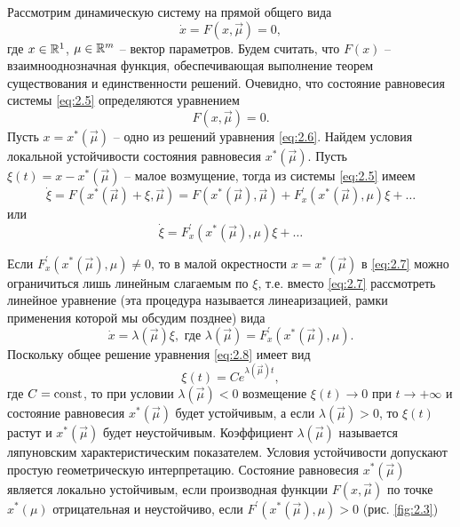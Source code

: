 Рассмотрим динамическую систему на прямой общего вида
\begin{equation}
	\label{eq:2.5}
	\dot x = F(x, \vec \mu) =0,
\end{equation}
где $x \in \mathbb{R}^1$, $\mathbf \mu \in \mathbb{R}^m$ -- вектор параметров. Будем считать, что $F(x)$ -- взаимнооднозначная функция, обеспечивающая выполнение теорем существования и единственности решений. Очевидно, что состояние равновесия системы \eqref{eq:2.5} определяются уравнением
\begin{equation}
	\label{eq:2.6}
	F(x, \vec \mu) =0.
\end{equation}
Пусть $x=x^*(\vec \mu)$ -- одно из решений уравнения \eqref{eq:2.6}. Найдем условия локальной устойчивости состояния равновесия $x^*(\vec \mu)$. Пусть $\xi(t) = x - x^*(\vec \mu)$ -- малое возмущение, тогда из системы \eqref{eq:2.5} имеем
\begin{equation}
	\label{eq:}
	\dot \xi = F(x^*(\vec \mu)+ \xi, \vec \mu) = F(x^*(\vec \mu), \vec \mu) + F^\prime_x (x^*(\vec \mu), \mu) \xi + \dots
\end{equation}
или
\begin{equation}
	\label{eq:2.7}
	\dot \xi = F^\prime_x (x^*(\vec \mu), \mu) \xi + \dots
\end{equation}

Если $F^\prime_x (x^*(\vec \mu), \mu) \neq 0$, то в малой окрестности $x=x^*(\vec \mu)$ в  \eqref{eq:2.7} можно ограничиться лишь линейным слагаемым по $\xi$, т.е. вместо \eqref{eq:2.7} рассмотреть линейное уравнение (эта процедура называется линеаризацией, рамки применения которой мы обсудим позднее) вида
\begin{equation}
	\label{eq:2.8}
	\dot x = \lambda(\vec \mu) \xi, \text{ где } \lambda(\vec \mu) = F^\prime_x (x^*(\vec \mu), \mu).
\end{equation}
Поскольку общее решение уравнения \eqref{eq:2.8} имеет вид
\begin{equation}
	\label{eq:}
	\xi(t) = Ce^{\lambda(\vec \mu)t},
\end{equation}
где $C=\textrm{const}$, то при условии $\lambda(\vec \mu)<0$ возмещение $\xi(t) \rightarrow 0$ при $t \rightarrow + \infty$ и состояние равновесия $x^*(\vec \mu)$ будет устойчивым, а если $\lambda(\vec \mu) > 0 $, то $\xi(t)$ растут и $x^*(\vec \mu)$ будет неустойчивым. Коэффициент $\lambda (\vec \mu)$ называется ляпуновским характеристическим показателем. Условия устойчивости допускают простую геометрическую интерпретацию. Состояние равновесия $x^*(\vec \mu)$ является локально устойчивым, если производная функции $F(x, \vec \mu)$ по точке $x^*(\mu)$ отрицательная и неустойчиво, если $F^\prime(x^*(\vec \mu), \mu)>0$ (рис. \ref{fig:2.3}) 

